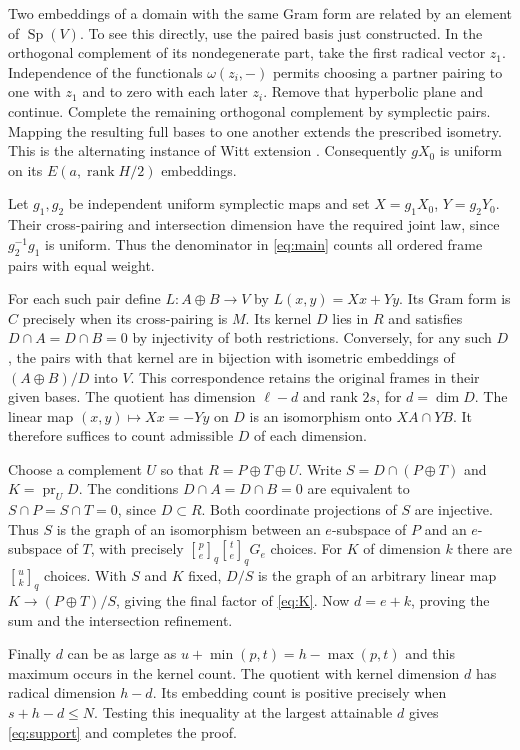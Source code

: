 \documentclass[10pt]{article}
\DeclareMathOperator{\rk}{rank}
\DeclareMathOperator{\Sp}{Sp}
\newcommand{\gb}[2]{\genfrac{[}{]}{0pt}{}{#1}{#2}_{q}}
\begin{document}
Two embeddings of a domain with the same Gram form are related by an element of $\Sp(V)$. To see this directly, use the paired basis just constructed. In the orthogonal complement of its nondegenerate part, take the first radical vector $z_1$. Independence of the functionals $\omega(z_i,-)$ permits choosing a partner pairing to one with $z_1$ and to zero with each later $z_i$. Remove that hyperbolic plane and continue. Complete the remaining orthogonal complement by symplectic pairs. Mapping the resulting full bases to one another extends the prescribed isometry. This is the alternating instance of Witt extension \cite{witt}. Consequently $gX_0$ is uniform on its $E(a,\rk H/2)$ embeddings.

Let $g_1,g_2$ be independent uniform symplectic maps and set $X=g_1X_0$, $Y=g_2Y_0$. Their cross-pairing and intersection dimension have the required joint law, since $g_2^{-1}g_1$ is uniform. Thus the denominator in \eqref{eq:main} counts all ordered frame pairs with equal weight.

For each such pair define $L:A\oplus B\to V$ by $L(x,y)=Xx+Yy$. Its Gram form is $C$ precisely when its cross-pairing is $M$. Its kernel $D$ lies in $R$ and satisfies $D\cap A=D\cap B=0$ by injectivity of both restrictions. Conversely, for any such $D$, the pairs with that kernel are in bijection with isometric embeddings of $(A\oplus B)/D$ into $V$. This correspondence retains the original frames in their given bases. The quotient has dimension $\ell-d$ and rank $2s$, for $d=\dim D$. The linear map $(x,y)\mapsto Xx=-Yy$ on $D$ is an isomorphism onto $XA\cap YB$. It therefore suffices to count admissible $D$ of each dimension.

Choose a complement $U$ so that $R=P\oplus T\oplus U$. Write $S=D\cap(P\oplus T)$ and $K=\operatorname{pr}_U D$. The conditions $D\cap A=D\cap B=0$ are equivalent to $S\cap P=S\cap T=0$, since $D\subset R$. Both coordinate projections of $S$ are injective. Thus $S$ is the graph of an isomorphism between an $e$-subspace of $P$ and an $e$-subspace of $T$, with precisely $\gb{p}{e}\gb{t}{e}G_e$ choices. For $K$ of dimension $k$ there are $\gb{u}{k}$ choices. With $S$ and $K$ fixed, $D/S$ is the graph of an arbitrary linear map $K\to(P\oplus T)/S$, giving the final factor of \eqref{eq:K}. Now $d=e+k$, proving the sum and the intersection refinement.

Finally $d$ can be as large as $u+\min(p,t)=h-\max(p,t)$ and this maximum occurs in the kernel count. The quotient with kernel dimension $d$ has radical dimension $h-d$. Its embedding count is positive precisely when $s+h-d\le N$. Testing this inequality at the largest attainable $d$ gives \eqref{eq:support} and completes the proof.
\end{document}
